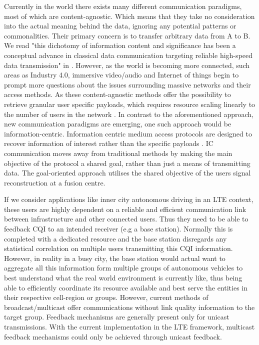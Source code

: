 \documentclass{article}
\begin{document}
Currently in the world there exists many different communication paradigms, most of which are content-agnostic. Which means that they take no consideration into the actual meaning behind the data, ignoring any potential patterns or commonalities. Their primary concern is to transfer arbitrary data from A to B. We read "this dichotomy of information content and significance has been a conceptual advance in classical data communication targeting reliable high-speed data transmission" in \cite{kountouris}. 
However, as the world is becoming more connected, such areas as Industry 4.0, immersive video/audio and Internet of things begin to prompt more questions about the issues surrounding massive networks and their access methods. As these content-agnostic methods offer the possibility to retrieve granular user specific payloads, which requires resource scaling linearly to the number of users in the network \cite{aloha,graphbased_analysis,coded_ran,capacity_gauss}. In contrast to the aforementioned approach, new communication paradigms are emerging, one such approach would be information-centric. Information centric  medium access protocols are designed to recover information of interest rather than the specific payloads \cite{kountouris,sem_coms,sem_filter,source_chane_coding,source_chane_coding2}. \ac{IC} communication moves away from traditional methods by making the main objective of the protocol a shared goal, rather than just a means of transmitting data. The goal-oriented approach utilises the shared objective of the users signal reconstruction at a fusion centre. 

If we consider applications like inner city autonomous driving in an LTE context, these users are highly dependent on a reliable and efficient communication link between infrastructure and other connected users. Thus they need to be able to feedback \ac{CQI} to an intended receiver (e.g a base station). Normally this is completed with a dedicated resource and the base station disregards any statistical correlation on multiple users transmitting this \ac{CQI} information. However, in reality in a busy city, the base station would actual want to aggregate all this information form multiple groups of autonomous vehicles to best understand what the real world environment is currently like, thus being able to efficiently coordinate its resource available and best serve the entities in their respective cell-region or groups. However, current methods of broadcast/multicast offer communications without link quality information to the target group. Feedback mechanisms are generally present only for unicast transmissions. With the current implementation in the LTE framework, multicast feedback mechanisms could only be achieved through unicast feedback.
\end{document}
